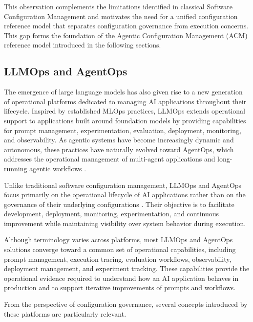 \documentclass[10pt]{article}
\begin{document}
This observation complements the limitations identified in classical Software Configuration Management and motivates the need for a unified configuration reference model that separates configuration governance from execution concerns. This gap forms the foundation of the Agentic Configuration Management (ACM) reference model introduced in the following sections.

\subsection{LLMOps and AgentOps}
\label{sec:llmops_agentops}

The emergence of large language models has also given rise to a new generation of operational platforms dedicated to managing AI applications throughout their lifecycle. Inspired by established MLOps practices, LLMOps extends operational support to applications built around foundation models by providing capabilities for prompt management, experimentation, evaluation, deployment, monitoring, and observability. As agentic systems have become increasingly dynamic and autonomous, these practices have naturally evolved toward AgentOps, which addresses the operational management of multi-agent applications and long-running agentic workflows \cite{cesarano2026grand, shavit2023practices, pandey2025agentic, dumas2026}.

Unlike traditional software configuration management, LLMOps and AgentOps focus primarily on the operational lifecycle of AI applications rather than on the governance of their underlying configurations \cite{pahune2025transitioning, amershi2019, dong2024agentops}. Their objective is to facilitate development, deployment, monitoring, experimentation, and continuous improvement while maintaining visibility over system behavior during execution.

Although terminology varies across platforms, most LLMOps and AgentOps solutions converge toward a common set of operational capabilities, including prompt management, execution tracing, evaluation workflows, observability, deployment management, and experiment tracking. These capabilities provide the operational evidence required to understand how an AI application behaves in production and to support iterative improvements of prompts and workflows.

From the perspective of configuration governance, several concepts introduced by these platforms are particularly relevant. 
\end{document}
